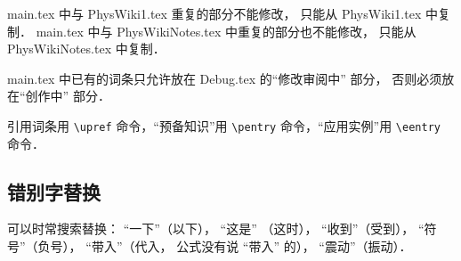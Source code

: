 main.tex 中与 PhysWiki1.tex 重复的部分不能修改， 只能从 PhysWiki1.tex 中复制． main.tex 中与 PhysWikiNotes.tex 中重复的部分也不能修改， 只能从 PhysWikiNotes.tex 中复制．

main.tex 中已有的词条只允许放在 Debug.tex 的“修改审阅中” 部分， 否则必须放在“创作中” 部分．

引用词条用 \verb|\upref| 命令，“预备知识”用 \verb|\pentry| 命令，“应用实例”用 \verb|\eentry| 命令．

\subsection{错别字替换}
可以时常搜索替换： “一下”（以下）， “这是” （这时）， “收到”（受到）， “符号”（负号）， “带入”（代入， 公式没有说 “带入” 的）， “震动”（振动）．

